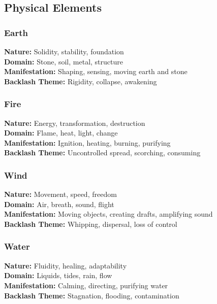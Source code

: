\subsection{Physical Elements}

\subsubsection{Earth}
\textbf{Nature:} Solidity, stability, foundation\\
\textbf{Domain:} Stone, soil, metal, structure\\
\textbf{Manifestation:} Shaping, sensing, moving earth and stone\\
\textbf{Backlash Theme:} Rigidity, collapse, awakening

\subsubsection{Fire}
\textbf{Nature:} Energy, transformation, destruction\\
\textbf{Domain:} Flame, heat, light, change\\
\textbf{Manifestation:} Ignition, heating, burning, purifying\\
\textbf{Backlash Theme:} Uncontrolled spread, scorching, consuming

\subsubsection{Wind}
\textbf{Nature:} Movement, speed, freedom\\
\textbf{Domain:} Air, breath, sound, flight\\
\textbf{Manifestation:} Moving objects, creating drafts, amplifying sound\\
\textbf{Backlash Theme:} Whipping, dispersal, loss of control

\subsubsection{Water}
\textbf{Nature:} Fluidity, healing, adaptability\\
\textbf{Domain:} Liquids, tides, rain, flow\\
\textbf{Manifestation:} Calming, directing, purifying water\\
\textbf{Backlash Theme:} Stagnation, flooding, contamination

